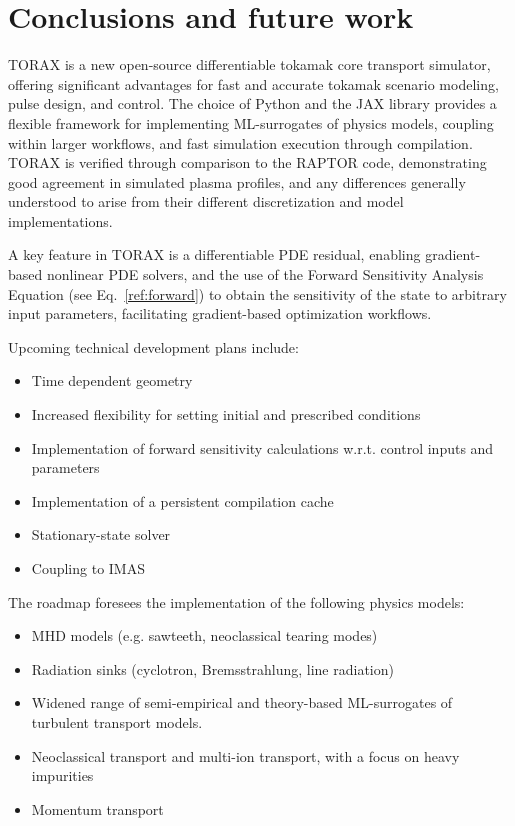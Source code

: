 \documentclass[aps, reprint, nofootinbib]{revtex4-2}
\begin{document}

\section{Conclusions and future work}
TORAX is a new open-source differentiable tokamak core transport simulator, offering significant advantages for fast and accurate tokamak scenario modeling, pulse design, and control. The choice of Python and the JAX library provides a flexible framework for implementing ML-surrogates of physics models, coupling within larger workflows, and fast simulation execution through compilation. TORAX is verified through comparison to the RAPTOR code, demonstrating good agreement in simulated plasma profiles, and any differences generally understood to arise from their different discretization and model implementations.

A key feature in TORAX is a differentiable PDE residual, enabling gradient-based nonlinear PDE solvers, and the use of the Forward Sensitivity Analysis Equation (see Eq.~\ref{ref:forward}) to obtain the sensitivity of the state to arbitrary input parameters, facilitating gradient-based optimization workflows.

Upcoming technical development plans include:
\begin{itemize}
    \item Time dependent geometry
    \item Increased flexibility for setting initial and prescribed conditions
    \item Implementation of forward sensitivity calculations w.r.t. control inputs and parameters
    \item Implementation of a persistent compilation cache
    \item Stationary-state solver
    \item Coupling to IMAS
\end{itemize}

The roadmap foresees the implementation of the following physics models:
\begin{itemize}
    \item MHD models (e.g. sawteeth, neoclassical tearing modes)
    \item Radiation sinks (cyclotron, Bremsstrahlung, line radiation)
    \item Widened range of semi-empirical and theory-based ML-surrogates of turbulent transport models.
    \item Neoclassical transport and multi-ion transport, with a focus on heavy impurities
    \item Momentum transport
\end{itemize}
\end{document}
